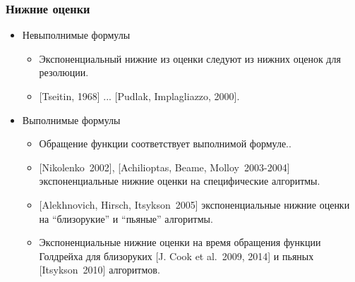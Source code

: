 \begin{frame}
    \frametitle{Нижние оценки}

    \pause
	\begin{itemize}
		\item Невыполнимые формулы
		\begin{itemize}
            \item{} Экспоненциальный нижние из оценки следуют из нижних оценок для резолюции.
			\item{} [Tseitin, 1968] ... [Pudlak, Implagliazzo, 2000].
		\end{itemize}
        \pause
		\item Выполнимые формулы
		\begin{itemize}
			\item Обращение функции соответствует выполнимой формуле..
            \pause
            \item{} [Nikolenko~2002], [Achilioptas, Beame, Molloy~2003-2004] экспоненциальные нижние оценки на специфические алгоритмы.
            \item{} [Alekhnovich, Hirsch, Itsykson~2005] экспоненциальные нижние оценки на ``близорукие'' и ``пьяные'' алгоритмы.
            \pause
            \item{}  Экспоненциальные нижние оценки на время обращения функции Голдрейха для близоруких [J. Cook et al.~2009,
				2014] и пьяных [Itsykson~2010] алгоритмов.
		\end{itemize}
	\end{itemize}
\end{frame}

